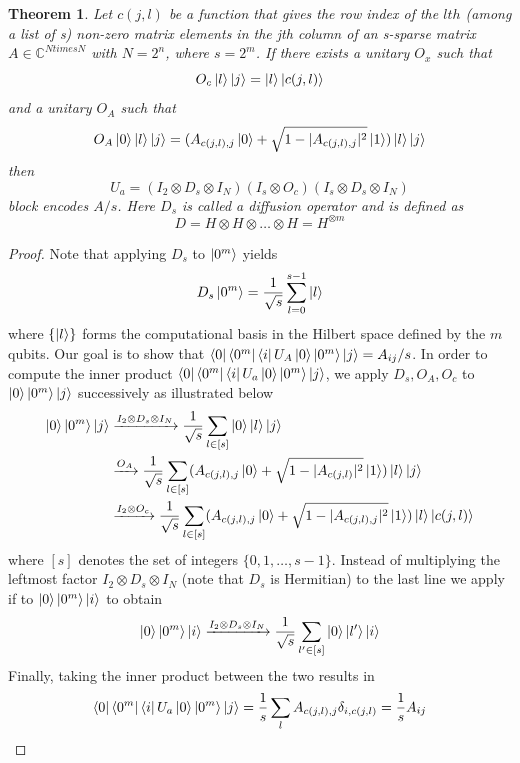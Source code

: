 \documentclass[12pt, oneside]{book}
\newtheorem{theorem}{Theorem}[section]
\theoremstyle{definition}
\theoremstyle{definition}
\theoremstyle{remark}
\begin{document}
\begin{theorem}
    Let $c(j,l)$ be a function that gives the row index of the $lth$ (among a list of s) non-zero matrix elements in the jth column of an s-sparse matrix $A \in\mathbb{C}^{Ntimes N}$ with $N=2^n$, where $s=2^m$. If there exists a unitary $O_x$ such that
    \[
    O_c\ket{l}\ket{j}=\ket{l}\ket{c(j,l)}
    \]
    and a unitary $O_A$ such that
    \[
    O_A\ket{0}\ket{l}\ket{j}=(A_{c(j,l),j}\ket{0}+\sqrt{1-|A_{c(j,l),j}|^2}\ket{1})\ket{l}\ket{j}
    \]
    then 
    \[
    U_a =(I_2 \otimes D_s \otimes I_N)(I_s \otimes O_c)(I_s \otimes D_s \otimes I_N)
    \]
    block encodes $A/s$. Here $D_s$ is called a diffusion operator and is defined as 
    \[
    D=H \otimes H \otimes \ldots \otimes H=H^{\otimes m}
    \]
\end{theorem}
\begin{proof}
    Note that applying $D_s$ to $\ket{0^m}$ yields
    \[
    D_s\ket{0^m}=\frac{1}{\sqrt{s}}\sum_{l=0}^{s-1} \ket{l}
    \]
    where $\{\ket{l}\}$ forms the computational basis in the Hilbert space defined by the $m$ qubits. Our goal is to show that $\bra{0}\bra{0^m}\bra{i}U_A\ket{0}\ket{0^m}\ket{j}=A_{ij}/s$. In order to compute the inner product $\bra{0}\bra{0^m}\bra{i}U_a\ket{0}\ket{0^m}\ket{j}$, we apply $D_s,O_A,O_c$ to $\ket{0}\ket{0^m}\ket{j}$ successively as illustrated below
    \begin{align*}
        \ket{0}\ket{0^m}\ket{j} &\xrightarrow{I_2 \otimes D_s \otimes I_N} \frac{1}{\sqrt{s}} \sum_{l\in[s]}\ket{0}\ket{l}\ket{j}\\
        &\xrightarrow{O_A} \frac{1}{\sqrt{s}}\sum_{l\in [s]}(A_{c(j,l),j}\ket{0}+\sqrt{1-|A_{c(j,l)}|^2}\ket{1})\ket{l}\ket{j}\\
        &\xrightarrow{I_2 \otimes O_c} \frac{1}{\sqrt{s}}\sum_{l\in[s]}(A_{c(j,l),j}\ket{0}+\sqrt{1-|A_{c(j,l),j}|^2}\ket{1})\ket{l}\ket{c(j,l)}
    \end{align*}
    where $[s]$ denotes the set of integers $\{0,1,\ldots,s-1\}$. Instead of multiplying the leftmost factor $I_2 \otimes D_s \otimes I_N$ (note that $D_s$ is Hermitian) to the last line we apply if to $\ket{0}\ket{0^m}\ket{i}$ to obtain
    \[
    \ket{0}\ket{0^m}\ket{i}\xrightarrow{I_2 \otimes D_s \otimes I_N} \frac{1}{\sqrt{s}}\sum_{l' \in [s]} \ket{0}\ket{l'}\ket{i}
    \]
    Finally, taking the inner product between the two results in 
    \[
    \bra{0}\bra{0^m}\bra{i}U_a \ket{0}\ket{0^m}\ket{j}=\frac{1}{s}\sum_l A_{c(j,l),j}\delta_{i,c(j,l)} =\frac{1}{s}A_{ij}
    \]
\end{proof}
\end{document}
